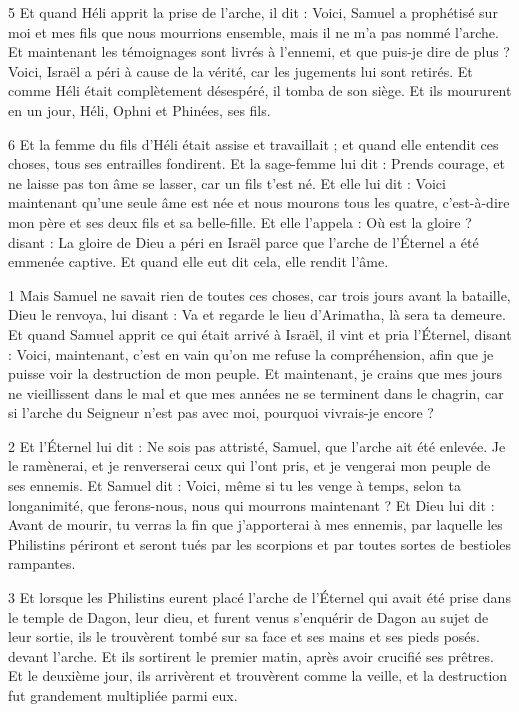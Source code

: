 \par 5 Et quand Héli apprit la prise de l'arche, il dit : Voici, Samuel a prophétisé sur moi et mes fils que nous mourrions ensemble, mais il ne m'a pas nommé l'arche. Et maintenant les témoignages sont livrés à l’ennemi, et que puis-je dire de plus ? Voici, Israël a péri à cause de la vérité, car les jugements lui sont retirés. Et comme Héli était complètement désespéré, il tomba de son siège. Et ils moururent en un jour, Héli, Ophni et Phinées, ses fils.

\par 6 Et la femme du fils d'Héli était assise et travaillait ; et quand elle entendit ces choses, tous ses entrailles fondirent. Et la sage-femme lui dit : Prends courage, et ne laisse pas ton âme se lasser, car un fils t'est né. Et elle lui dit : Voici maintenant qu'une seule âme est née et nous mourons tous les quatre, c'est-à-dire mon père et ses deux fils et sa belle-fille. Et elle l'appela : Où est la gloire ? disant : La gloire de Dieu a péri en Israël parce que l'arche de l'Éternel a été emmenée captive. Et quand elle eut dit cela, elle rendit l'âme.


\par 1 Mais Samuel ne savait rien de toutes ces choses, car trois jours avant la bataille, Dieu le renvoya, lui disant : Va et regarde le lieu d'Arimatha, là sera ta demeure. Et quand Samuel apprit ce qui était arrivé à Israël, il vint et pria l'Éternel, disant : Voici, maintenant, c'est en vain qu'on me refuse la compréhension, afin que je puisse voir la destruction de mon peuple. Et maintenant, je crains que mes jours ne vieillissent dans le mal et que mes années ne se terminent dans le chagrin, car si l'arche du Seigneur n'est pas avec moi, pourquoi vivrais-je encore ?

\par 2 Et l'Éternel lui dit : Ne sois pas attristé, Samuel, que l'arche ait été enlevée. Je le ramènerai, et je renverserai ceux qui l'ont pris, et je vengerai mon peuple de ses ennemis. Et Samuel dit : Voici, même si tu les venge à temps, selon ta longanimité, que ferons-nous, nous qui mourrons maintenant ? Et Dieu lui dit : Avant de mourir, tu verras la fin que j'apporterai à mes ennemis, par laquelle les Philistins périront et seront tués par les scorpions et par toutes sortes de bestioles rampantes.

\par 3 Et lorsque les Philistins eurent placé l'arche de l'Éternel qui avait été prise dans le temple de Dagon, leur dieu, et furent venus s'enquérir de Dagon au sujet de leur sortie, ils le trouvèrent tombé sur sa face et ses mains et ses pieds posés. devant l'arche. Et ils sortirent le premier matin, après avoir crucifié ses prêtres. Et le deuxième jour, ils arrivèrent et trouvèrent comme la veille, et la destruction fut grandement multipliée parmi eux.

